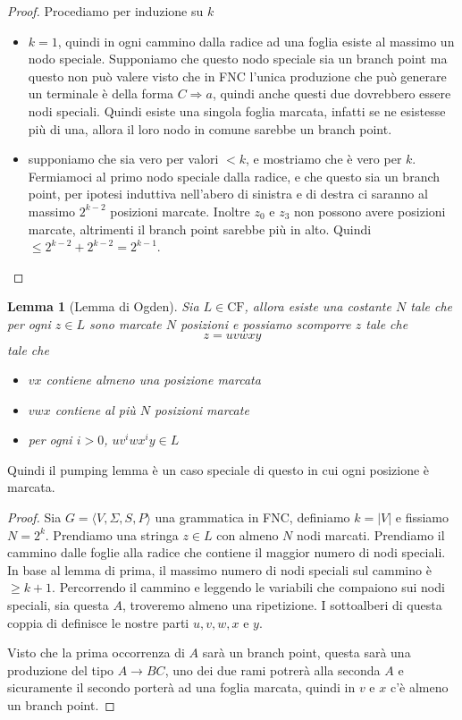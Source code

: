 \documentclass[12pt]{report}
\newtheorem{lemma}{Lemma}
\theoremstyle{definition}
\begin{document}
% 
\begin{proof}
 	Procediamo per induzione su $k$
 	\begin{itemize}
 		\item $k = 1$, quindi in ogni cammino dalla radice ad una foglia esiste al massimo un nodo speciale.
 			Supponiamo che questo nodo speciale sia un branch point
 			ma questo non può valere visto che in FNC l'unica produzione che può generare un terminale è della forma $C \Rightarrow a$, quindi anche questi due dovrebbero essere nodi speciali.
 			Quindi esiste una singola foglia marcata, infatti se ne esistesse più di una, allora il loro nodo in comune sarebbe un branch point.
 		\item supponiamo che sia vero per valori $< k$, e mostriamo che è vero per $k$.
 			Fermiamoci al primo nodo speciale dalla radice, e che questo sia un branch point, per ipotesi induttiva nell'abero di sinistra e di destra ci saranno al massimo $2^{k - 2}$ posizioni marcate.
 			Inoltre $z_0$ e $z_3$ non possono avere posizioni marcate, altrimenti il branch point sarebbe più in alto.
 			Quindi $\leq 2^{k - 2} + 2^{k - 2} = 2^{k - 1}$.
	\end{itemize}
\end{proof}

\begin{lemma}[Lemma di Ogden]
	\label{lemma:ogden}
	Sia $L \in \text{CF}$, allora esiste una costante $N$ tale che per ogni $z \in L$ sono marcate $N$ posizioni e possiamo scomporre $z$ tale che
	$$ z = u v w x y $$
	tale che
	\begin{itemize}
		\item $vx$ contiene almeno una posizione marcata
		\item $vwx$ contiene al più $N$ posizioni marcate
		\item per ogni $i > 0$, $u v^i w x^i y \in L$
	\end{itemize}
\end{lemma}
Quindi il pumping lemma è un caso speciale di questo in cui ogni posizione è marcata.
\begin{proof}
	Sia $G = \langle V, \Sigma, S, P \rangle$ una grammatica in FNC, definiamo $k = |V|$ e fissiamo $N = 2^k$.
	Prendiamo una stringa $z \in L$ con almeno $N$ nodi marcati.
	Prendiamo il cammino dalle foglie alla radice che contiene il maggior numero di nodi speciali.
	In base al lemma di prima, il massimo numero di nodi speciali sul cammino è $\geq k + 1$.
	Percorrendo il cammino e leggendo le variabili che compaiono sui nodi speciali, sia questa $A$, troveremo almeno una ripetizione.
	I sottoalberi di questa coppia di definisce le nostre parti $u, v, w, x$ e $y$.

	Visto che la prima occorrenza di $A$ sarà un branch point, questa sarà una produzione del tipo $A \rightarrow BC$, uno dei due rami potrerà alla seconda $A$ e sicuramente il secondo porterà ad una foglia marcata, quindi in $v$ e $x$ c'è almeno un branch point.
\end{proof}
\end{document}
